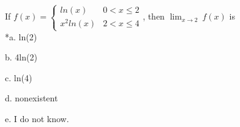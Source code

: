 
If $f(x) = \begin{cases}
ln(x) & 0<x\leq 2\\
x^2ln(x) & 2<x \leq 4
\end{cases}$, then
$\displaystyle\lim_{x \rightarrow 2}\ f(x)$ is\\

*a. ln(2)

b. 4ln(2)

c. ln(4)

d. nonexistent

e. I do not know.\\
